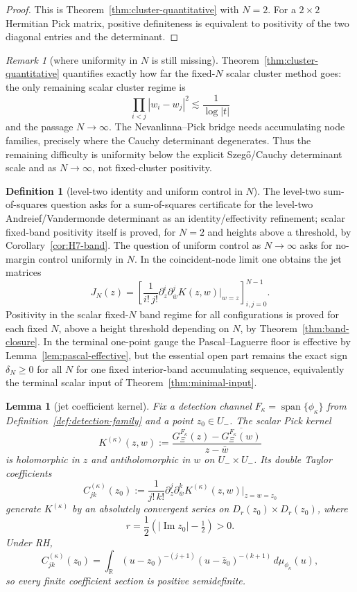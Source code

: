 \documentclass[11pt]{amsart}
\newtheorem{lemma}[theorem]{Lemma}
\theoremstyle{definition}
\newtheorem{definition}[theorem]{Definition}
\theoremstyle{remark}
\newtheorem{remark}[theorem]{Remark}
\theoremstyle{definition}
\renewcommand{\Im}{\operatorname{Im}}
\newcommand{\half}{\tfrac{1}{2}}
\newcommand{\R}{\mathbb{R}}
\newcommand{\GXi}{G_\Xi}
\begin{document}
\begin{proof}
This is Theorem~\ref{thm:cluster-quantitative} with $N=2$.  For a $2\times2$ Hermitian Pick matrix,
positive definiteness is equivalent to positivity of the two diagonal entries and the determinant.
\end{proof}

\begin{remark}[where uniformity in $N$ is still missing]\label{rmk:szego-hardness}
Theorem~\ref{thm:cluster-quantitative} quantifies exactly how far the fixed-$N$ scalar cluster method
goes: the only remaining scalar cluster regime is
\[
   \prod_{i<j}|w_i-w_j|^2
   \lesssim
   \frac1{\log|t|}
\]
and the passage $N\to\infty$.  The Nevanlinna--Pick bridge needs accumulating node families, precisely
where the Cauchy determinant degenerates.  Thus the remaining difficulty is uniformity below the
explicit Szeg\H{o}/Cauchy determinant scale and as $N\to\infty$, not fixed-cluster positivity.
\end{remark}

\begin{definition}[level-two identity and uniform control in $N$]\label{def:live-open-coordinates}
The level-two sum-of-squares question asks for a sum-of-squares certificate for the level-two
Andreief/Vandermonde determinant as an identity/effectivity refinement; scalar fixed-band positivity
itself is proved, for $N=2$ and heights above a threshold, by Corollary~\ref{cor:H7-band}.  The
question of uniform control as $N\to\infty$ asks for no-margin control uniformly in $N$.  In the
coincident-node limit one obtains the jet matrices
\[
   J_N(z)=
   \left[
      \frac1{i!\,j!}\partial_z^i\partial_{\bar w}^jK(z,w)\big|_{w=z}
   \right]_{i,j=0}^{N-1}.
\]
Positivity in the scalar fixed-$N$ band regime for all configurations is proved for each fixed $N$,
above a height threshold depending on $N$, by Theorem~\ref{thm:band-closure}.
In the terminal one-point gauge the Pascal--Laguerre floor is effective by
Lemma~\ref{lem:pascal-effective}, but the essential open part remains the exact sign
$\delta_N\ge0$ for all $N$ for one fixed interior-band accumulating sequence, equivalently the
terminal scalar input of Theorem~\ref{thm:minimal-input}.
\end{definition}

\begin{lemma}[jet coefficient kernel]\label{lem:jet-coeff}
Fix a detection channel $F_\kappa=\operatorname{span}\{\phi_\kappa\}$ from
Definition~\ref{def:detection-family} and a point $z_0\in U_-$.  The scalar Pick kernel
\[
   K^{(\kappa)}(z,w)
   :=
   \frac{\GXi^{F_\kappa}(z)-\overline{\GXi^{F_\kappa}(w)}}{z-\bar w}
\]
is holomorphic in $z$ and antiholomorphic in $w$ on $U_-\times U_-$.  Its double Taylor coefficients
\[
   C^{(\kappa)}_{jk}(z_0)
   :=
   \frac1{j!\,k!}
   \partial_z^j\partial_{\bar w}^kK^{(\kappa)}(z,w)\big|_{z=w=z_0}
\]
generate $K^{(\kappa)}$ by an absolutely convergent series on
$D_r(z_0)\times D_r(z_0)$, where
\[
   r=\frac12(|\Im z_0|-\half)>0.
\]
Under RH,
\[
   C^{(\kappa)}_{jk}(z_0)
   =
   \int_\R
      (u-z_0)^{-(j+1)}(u-\bar z_0)^{-(k+1)}
      \,d\mu_{\phi_\kappa}(u),
\]
so every finite coefficient section is positive semidefinite.
\end{lemma}
\end{document}
